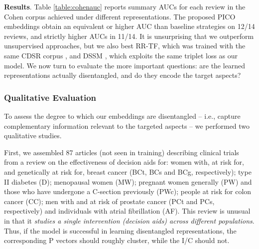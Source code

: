 \documentclass[11pt,a4paper]{article}
\begin{document}



\vspace{.15em}
\noindent \textbf{Results}. Table \ref{table:cohenauc} reports summary AUCs for each review in the Cohen corpus achieved under different representations. The proposed PICO embeddings obtain an equivalent or higher AUC than baseline strategies on 12/14 reviews, and strictly higher AUCs in 11/14. It is unsurprising that we outperform unsupervised approaches, but we also best RR-TF, which was trained with the same CDSR corpus \cite{wallace2016extracting}, and DSSM \cite{shen2014latent}, which exploits the same triplet loss as our model. We now turn to evaluate the more important questions: are the learned representations actually disentangled, and do they encode the target aspects? 


\vspace{-.35em}
\subsubsection{Qualitative Evaluation} 
\vspace{-.25em}
To assess the degree to which our embeddings are disentangled -- i.e., capture complementary information relevant to the targeted aspects -- we performed two qualitative studies.

First, we assembled 87 articles (not seen in training) describing clinical trials from a review on the effectiveness of decision aids \cite{o2009decision} for: women with, at risk for, and genetically at risk for, breast cancer (BCt, BCs and BCg, respectively); type II diabetes (D); menopausal women (MW); pregnant women generally (PW) and those who have undergone a C-section previously (PWc); people at risk for colon cancer (CC); men with and at risk of prostate cancer (PCt and PCs, respectively) and individuals with atrial fibrillation (AF). This review is unusual in that it \emph{studies a single intervention (decision aids) across different populations}. Thus, if the model is successful in learning disentangled representations, the corresponding P vectors should roughly cluster, while the I/C should not. 
\end{document}
